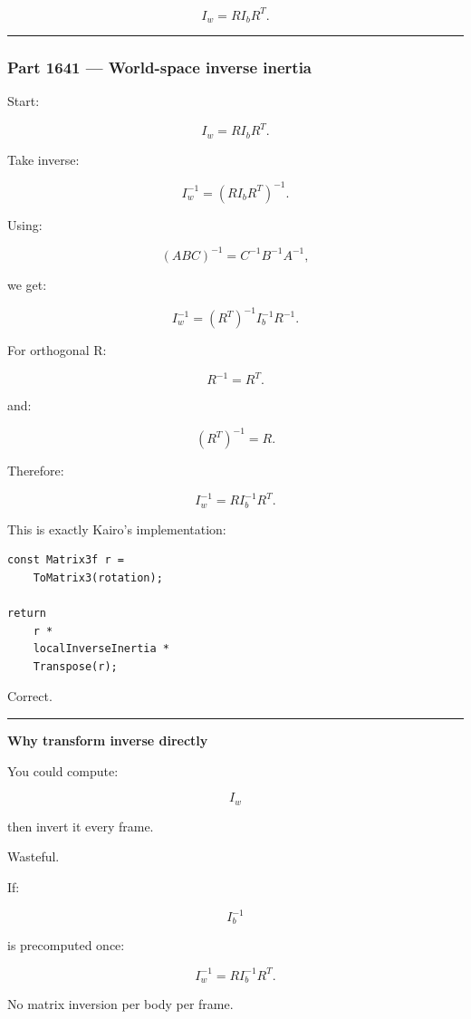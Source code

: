 \[
I_w=
RI_bR^T.
\]

\begin{center}\rule{0.5\linewidth}{0.5pt}\end{center}

\subsubsection{Part 1641 --- World-space inverse inertia}\label{part-1641-world-space-inverse-inertia}

Start:

\[
I_w
=
RI_bR^T.
\]

Take inverse:

\[
I_w^{-1}
=
(RI_bR^T)^{-1}.
\]

Using:

\[
(ABC)^{-1}
=
C^{-1}B^{-1}A^{-1},
\]

we get:

\[
I_w^{-1}
=
(R^T)^{-1}
I_b^{-1}
R^{-1}.
\]

For orthogonal R:

\[
R^{-1}=R^T.
\]

and:

\[
(R^T)^{-1}=R.
\]

Therefore:

\[
\boxed{
I_w^{-1}
=
R
I_b^{-1}
R^T.
}
\]

This is exactly Kairo's implementation:

\begin{verbatim}
const Matrix3f r =
    ToMatrix3(rotation);

return
    r *
    localInverseInertia *
    Transpose(r);
\end{verbatim}

Correct.

\begin{center}\rule{0.5\linewidth}{0.5pt}\end{center}

\textbf{Why transform inverse directly}

You could compute:

\[
I_w
\]

then invert it every frame.

Wasteful.

If:

\[
I_b^{-1}
\]

is precomputed once:

\[
I_w^{-1}
=
RI_b^{-1}R^T.
\]

No matrix inversion per body per frame.


